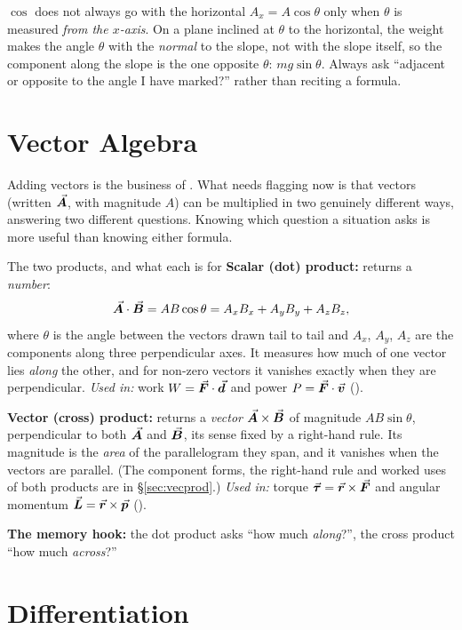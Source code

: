 \begin{trapbox}{$\cos$ does not always go with the horizontal}
$A_x=A\cos\theta$ only when $\theta$ is measured \emph{from the $x$-axis}. On a plane inclined at $\theta$
to the horizontal, the weight makes the angle $\theta$ with the \emph{normal} to the slope, not with the
slope itself, so the component along the slope is the one opposite $\theta$: $mg\sin\theta$. Always ask
``adjacent or opposite to the angle I have marked?'' rather than reciting a formula.
\end{trapbox}

\section{Vector Algebra}\label{sec:vecalg}

Adding vectors is the business of . What needs flagging now is that vectors (written
$\vec{\bm{A}}$, with magnitude $A$) can be multiplied in two genuinely different ways, answering two different
questions. Knowing which question a situation asks is more useful than knowing either formula.

\begin{defbox}{The two products, and what each is for}
\textbf{Scalar (dot) product:} returns a \emph{number}:
\[
\vec{\bm{A}}\cdot\vec{\bm{B}}=AB\cos\theta=A_xB_x+A_yB_y+A_zB_z,
\]
where $\theta$ is the angle between the vectors drawn tail to tail and $A_x$, $A_y$, $A_z$ are the
components along three perpendicular axes. It measures how much of one vector lies \emph{along} the
other, and for non-zero vectors it vanishes exactly when they are perpendicular. \emph{Used in:} work $W=\vec{\bm{F}}\cdot\vec{\bm{d}}$ and power $P=\vec{\bm{F}}\cdot\vec{\bm{v}}$ ().

\medskip
\textbf{Vector (cross) product:} returns a \emph{vector} $\vec{\bm{A}}\times\vec{\bm{B}}$ of magnitude $AB\sin\theta$,
perpendicular to both $\vec{\bm{A}}$ and $\vec{\bm{B}}$, its sense fixed by a right-hand rule. Its magnitude is the
\emph{area} of the parallelogram they span, and it vanishes when the vectors are parallel. (The
component forms, the right-hand rule and worked uses of both products are in \S\ref{sec:vecprod}.) \emph{Used in:} torque $\vec{\bm{\tau}}=\vec{\bm{r}}\times\vec{\bm{F}}$ and angular
momentum $\vec{\bm{L}}=\vec{\bm{r}}\times\vec{\bm{p}}$ ().

\medskip
\textbf{The memory hook:} the dot product asks ``how much \emph{along}?'', the cross product ``how much
\emph{across}?''
\end{defbox}

\section{Differentiation}

